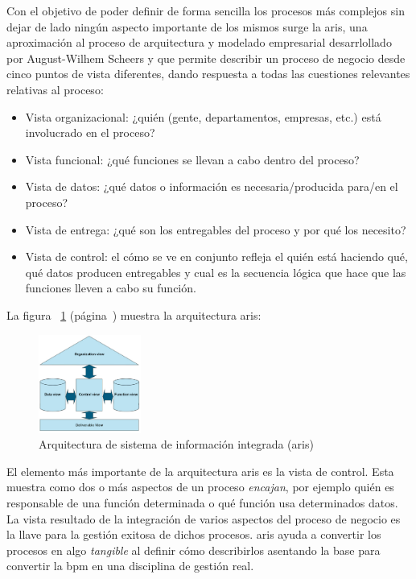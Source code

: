 Con el objetivo de poder definir de forma sencilla los procesos más complejos sin dejar de lado ningún aspecto importante de los mismos surge la \acrfull{aris}, una aproximación al proceso de arquitectura y modelado empresarial desarrlollado por August-Wilhem Scheers y que permite describir un proceso de negocio desde cinco puntos de vista diferentes, dando respuesta a todas las cuestiones relevantes relativas al proceso:

\begin{itemize}
\item Vista organizacional: ¿quién (gente, departamentos, empresas, etc.) está involucrado en el proceso?
\item Vista funcional: ¿qué funciones se llevan a cabo dentro del proceso?
\item Vista de datos: ¿qué datos o información es necesaria/producida para/en el proceso?
\item Vista de entrega: ¿qué son los entregables del proceso y por qué los necesito?
\item Vista de control: el cómo se ve en conjunto refleja el quién está haciendo qué, qué datos producen entregables y cual es la secuencia lógica que hace que las funciones lleven a cabo su función.
\end{itemize}


La figura ~\ref{fig:aris} (página~\pageref{fig:aris})  muestra la arquitectura \acrshort{aris}:


\begin{figure}[H]
  \centering
  \includegraphics[width=0.30\textwidth]{imaxes/aris.png}
  \caption{Arquitectura de sistema de información integrada (\acrshort{aris})}
  \label{fig:aris}
\end{figure}


El elemento más importante de la arquitectura \acrshort{aris} es la vista de control. Esta muestra como dos o más aspectos de un proceso \textit{encajan}, por ejemplo quién es responsable de una función determinada o qué función usa determinados datos. La vista resultado de la integración de varios aspectos del proceso de negocio es la llave para la gestión exitosa de dichos procesos. \acrshort{aris} ayuda a convertir los procesos en algo \textit{tangible} al definir cómo describirlos asentando la base para convertir la \acrlong{bpm} en una disciplina de gestión real.


